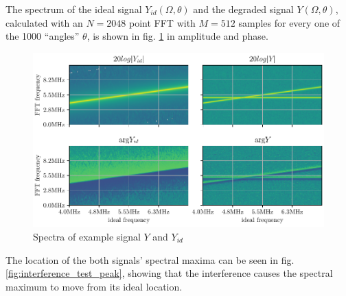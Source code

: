 The spectrum of the ideal signal $Y_{id}(\Omega, \theta)$ and the degraded signal $Y(\Omega,\theta)$,
calculated with an $N=2048$ point FFT with $M=512$ samples for every one of the 1000 ``angles'' $\theta$,
is shown in fig. \ref{fig:interference_test_spectrum} in amplitude and phase.
\begin{figure}
    \centering
    \includegraphics[width=\textwidth]{../figures/interference_test_fft.pdf}
    \caption{Spectra of example signal $Y$ and $Y_{id}$}
    \label{fig:interference_test_spectrum}
\end{figure}
The location of the both signals' spectral maxima can be seen in fig. \ref{fig:interference_test_peak},
showing that the interference causes the spectral maximum to move from its ideal location.
